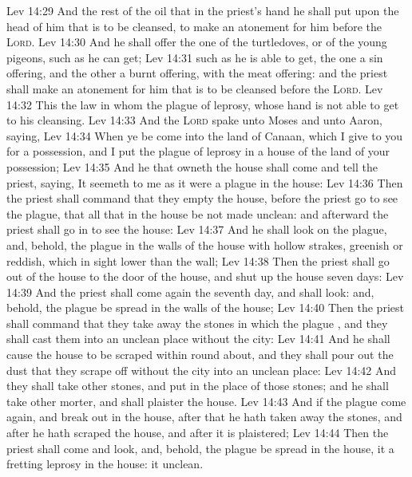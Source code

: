 \vs Lev 14:29 And the rest of the oil that  in the priest's hand he shall put upon the head of him that is to be cleansed, to make an atonement for him before the \textsc{Lord}.
\vs Lev 14:30 And he shall offer the one of the turtledoves, or of the young pigeons, such as he can get;
\vs Lev 14:31  such as he is able to get, the one  a sin offering, and the other  a burnt offering, with the meat offering: and the priest shall make an atonement for him that is to be cleansed before the \textsc{Lord}.
\vs Lev 14:32 This  the law  in whom  the plague of leprosy, whose hand is not able to get  to his cleansing.
\vs Lev 14:33 And the \textsc{Lord} spake unto Moses and unto Aaron, saying,
\vs Lev 14:34 When ye be come into the land of Canaan, which I give to you for a possession, and I put the plague of leprosy in a house of the land of your possession;
\vs Lev 14:35 And he that owneth the house shall come and tell the priest, saying, It seemeth to me  as it were a plague in the house:
\vs Lev 14:36 Then the priest shall command that they empty the house, before the priest go  to see the plague, that all that  in the house be not made unclean: and afterward the priest shall go in to see the house:
\vs Lev 14:37 And he shall look on the plague, and, behold,  the plague  in the walls of the house with hollow strakes, greenish or reddish, which in sight  lower than the wall;
\vs Lev 14:38 Then the priest shall go out of the house to the door of the house, and shut up the house seven days:
\vs Lev 14:39 And the priest shall come again the seventh day, and shall look: and, behold,  the plague be spread in the walls of the house;
\vs Lev 14:40 Then the priest shall command that they take away the stones in which the plague , and they shall cast them into an unclean place without the city:
\vs Lev 14:41 And he shall cause the house to be scraped within round about, and they shall pour out the dust that they scrape off without the city into an unclean place:
\vs Lev 14:42 And they shall take other stones, and put  in the place of those stones; and he shall take other morter, and shall plaister the house.
\vs Lev 14:43 And if the plague come again, and break out in the house, after that he hath taken away the stones, and after he hath scraped the house, and after it is plaistered;
\vs Lev 14:44 Then the priest shall come and look, and, behold,  the plague be spread in the house, it  a fretting leprosy in the house: it  unclean.
